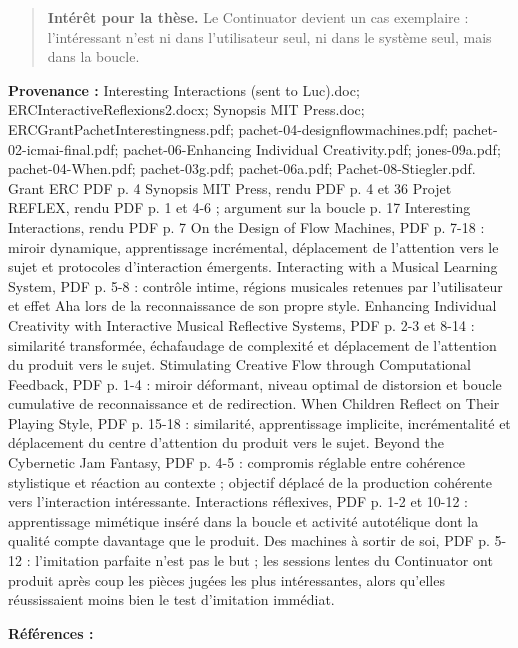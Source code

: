 \documentclass[10pt,a4paper]{article}
\begin{document}
\begin{quote}
\textbf{Intérêt pour la thèse.} Le Continuator devient un cas exemplaire : l'intéressant n'est ni dans l'utilisateur seul, ni dans le système seul, mais dans la boucle.
\end{quote}
{\footnotesize\color{metadata}\textbf{Provenance :} Interesting Interactions (sent to Luc).doc; ERCInteractiveReflexions2.docx; Synopsis MIT Press.doc; ERCGrantPachetInterestingness.pdf; pachet-04-designflowmachines.pdf; pachet-02-icmai-final.pdf; pachet-06-Enhancing Individual Creativity.pdf; jones-09a.pdf; pachet-04-When.pdf; pachet-03g.pdf; pachet-06a.pdf; Pachet-08-Stiegler.pdf. Grant ERC PDF p. 4 Synopsis MIT Press, rendu PDF p. 4 et 36 Projet REFLEX, rendu PDF p. 1 et 4-6 ; argument sur la boucle p. 17 Interesting Interactions, rendu PDF p. 7 On the Design of Flow Machines, PDF p. 7-18 : miroir dynamique, apprentissage incrémental, déplacement de l'attention vers le sujet et protocoles d'interaction émergents. Interacting with a Musical Learning System, PDF p. 5-8 : contrôle intime, régions musicales retenues par l'utilisateur et effet Aha lors de la reconnaissance de son propre style. Enhancing Individual Creativity with Interactive Musical Reflective Systems, PDF p. 2-3 et 8-14 : similarité transformée, échafaudage de complexité et déplacement de l'attention du produit vers le sujet. Stimulating Creative Flow through Computational Feedback, PDF p. 1-4 : miroir déformant, niveau optimal de distorsion et boucle cumulative de reconnaissance et de redirection. When Children Reflect on Their Playing Style, PDF p. 15-18 : similarité, apprentissage implicite, incrémentalité et déplacement du centre d'attention du produit vers le sujet. Beyond the Cybernetic Jam Fantasy, PDF p. 4-5 : compromis réglable entre cohérence stylistique et réaction au contexte ; objectif déplacé de la production cohérente vers l'interaction intéressante. Interactions réflexives, PDF p. 1-2 et 10-12 : apprentissage mimétique inséré dans la boucle et activité autotélique dont la qualité compte davantage que le produit. Des machines à sortir de soi, PDF p. 5-12 : l'imitation parfaite n'est pas le but ; les sessions lentes du Continuator ont produit après coup les pièces jugées les plus intéressantes, alors qu'elles réussissaient moins bien le test d'imitation immédiat.\par}
{\footnotesize\color{metadata}\textbf{Références :} \parencite{pachet2004flowmachines,pachet2002continuatorinteraction,pachet2006reflective,jones2009stimulating,pachet2004childrenreflect,pachet2004cybernetic,pachet2006interactionsreflexives,pachet2008machines}\par}
\end{document}
